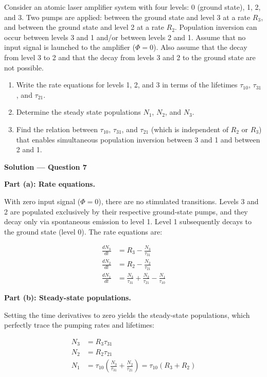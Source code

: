 \begin{question}[Question 7]Consider an atomic laser amplifier system with four levels: 0 (ground
state), 1, 2, and 3. Two pumps are applied: between the ground state and level 3 at a rate
$R_{3}$, and between the ground state and level 2 at a rate $R_{2}$. Population inversion can
occur between levels 3 and 1 and/or between levels 2 and 1. Assume that no input signal is
launched to the amplifier ($\Phi=0$). Also assume that the decay from level 3 to 2 and that the
decay from levels 3 and 2 to the ground state are not possible.

\begin{enumerate}[label=(\alph*)]
  \item Write the rate equations for levels 1, 2, and 3 in terms of the lifetimes $\tau_{10}$,
        $\tau_{31}$, and $\tau_{21}$.
  \item Determine the steady state populations $N_{1}$, $N_{2}$, and $N_{3}$.
  \item Find the relation between $\tau_{10}$, $\tau_{31}$, and $\tau_{21}$ (which is
        independent of $R_{2}$ or $R_{3}$) that enables simultaneous population inversion
        between 3 and 1 and between 2 and 1.
\end{enumerate}
\end{question}

\textbf{\large Solution --- Question 7}

\textbf{Part (a): Rate equations.}

With zero input signal ($\Phi=0$), there are no stimulated transitions. Levels 3 and 2 are populated exclusively by their respective ground-state pumps, and they decay only via spontaneous emission to level 1. Level 1 subsequently decays to the ground state (level 0). The rate equations are:

\begin{align*}
  \frac{dN_3}{dt} &= R_3 - \frac{N_3}{\tau_{31}} \\[1ex]
  \frac{dN_2}{dt} &= R_2 - \frac{N_2}{\tau_{21}} \\[1ex]
  \frac{dN_1}{dt} &= \frac{N_3}{\tau_{31}} + \frac{N_2}{\tau_{21}} - \frac{N_1}{\tau_{10}}
\end{align*}

\textbf{Part (b): Steady-state populations.}

Setting the time derivatives to zero yields the steady-state populations, which perfectly trace the pumping rates and lifetimes:

\begin{align*}
  N_3 &= R_3 \tau_{31} \\[1ex]
  N_2 &= R_2 \tau_{21} \\[1ex]
  N_1 &= \tau_{10}\left( \frac{N_3}{\tau_{31}} + \frac{N_2}{\tau_{21}} \right) = \tau_{10}(R_3 + R_2)
\end{align*}

